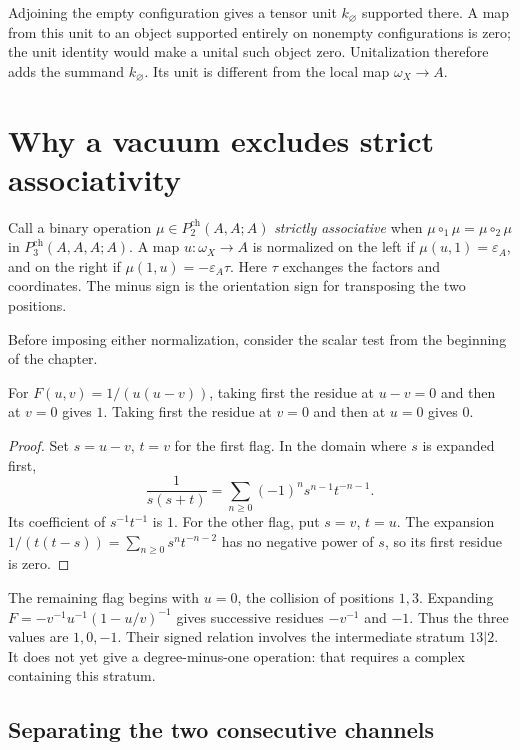 Adjoining the empty configuration gives a tensor unit
\(k_\varnothing\) supported there. A map from this unit to an
object supported entirely on nonempty configurations is zero;
the unit identity would make a unital such object zero.
Unitalization therefore adds the summand \(k_\varnothing\).
Its unit is different from the local map \(\omega_X\to A\).

\section{Why a vacuum excludes strict associativity}
\label{e1f:sec:collapse}

Call a binary operation \(\mu\in P_2^{\mathrm{ch}}(A,A;A)\)
\emph{strictly associative} when
\(\mu\circ_1\mu=\mu\circ_2\mu\) in
\(P_3^{\mathrm{ch}}(A,A,A;A)\). A map \(u:\omega_X\to A\)
is normalized on the left if
\(\mu(u,1)=\varepsilon_A\), and on the right if
\(\mu(1,u)=-\varepsilon_A\tau\). Here \(\tau\) exchanges
the factors and coordinates. The minus sign is the orientation
sign for transposing the two positions.

Before imposing either normalization, consider the scalar test
from the beginning of the chapter.

\begin{proposition}\label{e1f:prop:flags}
For \(F(u,v)=1/(u(u-v))\), taking first the residue at
\(u-v=0\) and then at \(v=0\) gives \(1\). Taking first the
residue at \(v=0\) and then at \(u=0\) gives \(0\).
\end{proposition}

\begin{proof}
Set \(s=u-v\), \(t=v\) for the first flag. In the domain
where \(s\) is expanded first,
\[
 \frac1{s(s+t)}
   =\sum_{n\geq0}(-1)^n s^{n-1}t^{-n-1}.
\]
Its coefficient of \(s^{-1}t^{-1}\) is \(1\).
For the other flag, put \(s=v\), \(t=u\). The expansion
\(1/(t(t-s))=\sum_{n\geq0}s^nt^{-n-2}\) has no negative
power of \(s\), so its first residue is zero.
\end{proof}

The remaining flag begins with \(u=0\), the collision of
positions \(1,3\). Expanding
\(F=-v^{-1}u^{-1}(1-u/v)^{-1}\) gives successive residues
\(-v^{-1}\) and \(-1\). Thus the three values are
\(1,0,-1\). Their signed relation involves the intermediate
stratum \(13|2\). It does not yet give a degree-minus-one
operation: that requires a complex containing this stratum.

\subsection{Separating the two consecutive channels}


